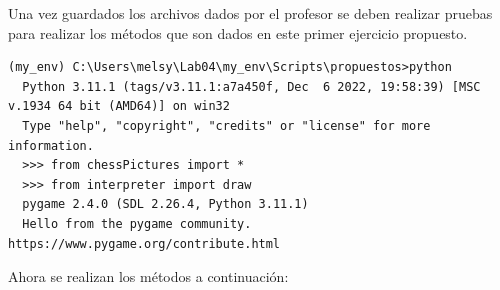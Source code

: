 \documentclass{article}
\begin{document}
  \vspace{\baselineskip}

  Una vez guardados los archivos dados por el profesor se deben realizar pruebas para realizar los métodos que son dados en este primer ejercicio propuesto.
  
  \begin{lstlisting}[style=shell]
  (my_env) C:\Users\melsy\Lab04\my_env\Scripts\propuestos>python
  Python 3.11.1 (tags/v3.11.1:a7a450f, Dec  6 2022, 19:58:39) [MSC v.1934 64 bit (AMD64)] on win32
  Type "help", "copyright", "credits" or "license" for more information.
  >>> from chessPictures import *
  >>> from interpreter import draw
  pygame 2.4.0 (SDL 2.26.4, Python 3.11.1)
  Hello from the pygame community. https://www.pygame.org/contribute.html
  \end{lstlisting}

  \pagebreak

  Ahora se realizan los métodos a continuación:

  \vspace{\baselineskip}
\end{document}
